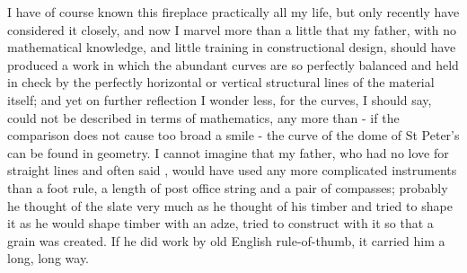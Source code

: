I have of course known this fireplace practically all my life, but only recently have considered it closely, and now I marvel more than a little that my father, with no mathematical knowledge, and little training in constructional design, should have produced a work in which the abundant curves are so perfectly balanced and held in check by the perfectly horizontal or vertical structural lines of the material itself; and yet on further reflection I wonder less, for the curves, I should say, could not be described in terms of mathematics, any more than - if the comparison does not cause too broad a smile - the curve of the dome of St Peter's can be found in geometry. I cannot imagine that my father, who had no love for straight lines and often said , would have used any more complicated instruments than a foot rule, a length of post office string and a pair of compasses; probably he thought of the slate very much as he thought of his timber and tried to shape it as he would shape timber with an adze, tried to construct with it so that a grain was created. If he did work by old English rule-of-thumb, it carried him a long, long way.